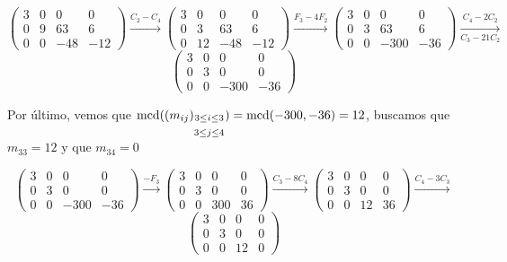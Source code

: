 \documentclass[12pt]{article}
\begin{document}
\begin{ejercicio}
\begin{enumerate}[label=(\alph*)]
            $$\begin{pmatrix}
                3 & 0 & 0 & 0 \\
                0 & 9 & 63 & 6 \\
                0 & 0 & -48 & -12
            \end{pmatrix}
            \xrightarrow{C_2 - C_4}
            \begin{pmatrix}
                3 & 0 & 0 & 0 \\
                0 & 3 & 63 & 6 \\
                0 & 12 & -48 & -12
            \end{pmatrix} 
            \xrightarrow{F_3 - 4F_2}
            \begin{pmatrix}
                3 & 0 & 0 & 0 \\
                0 & 3 & 63 & 6 \\
                0 & 0 & -300 & -36
            \end{pmatrix}
            \underset{C_3-21C_2}{\xrightarrow{C_4-2C_2}}$$
            $$
            \begin{pmatrix}
                3 & 0 & 0 & 0 \\
                0 & 3 & 0 & 0 \\
                0 & 0 & -300 & -36
            \end{pmatrix}
            $$

            Por último, vemos que $\operatorname{mcd}((m_{ij})_{\substack{3\le i\le 3 \\\\ 3\le j\le 4}}) = \operatorname{mcd}(-300, -36) = 12$, buscamos que $m_{33} = 12$ y que $m_{34} = 0$

            $$
            \begin{pmatrix}
                3 & 0 & 0 & 0 \\
                0 & 3 & 0 & 0 \\
                0 & 0 & -300 & -36
            \end{pmatrix}
            \xrightarrow{-F_3}
            \begin{pmatrix}
                3 & 0 & 0 & 0 \\
                0 & 3 & 0 & 0 \\
                0 & 0 & 300 & 36
            \end{pmatrix}
            \xrightarrow{C_3 - 8C_4}
            \begin{pmatrix}
                3 & 0 & 0 & 0 \\
                0 & 3 & 0 & 0 \\
                0 & 0 & 12 & 36
            \end{pmatrix}
            \xrightarrow{C_4 - 3C_3}$$
            $$
            \begin{pmatrix}
                3 & 0 & 0 & 0 \\
                0 & 3 & 0 & 0 \\
                0 & 0 & 12 & 0
            \end{pmatrix}
            $$


\end{enumerate}
\end{ejercicio}
\end{document}
